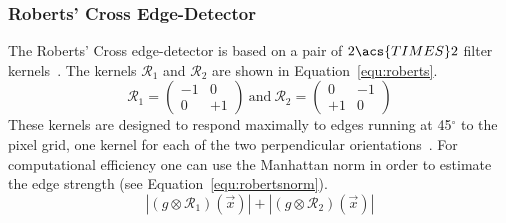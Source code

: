 \documentclass[12pt,a4paper,oneside,openright]{book}
\newcommand{\equ}[1]{Equation~\ref{equ:#1}}
\begin{document}
\begin{CJK}{UTF8}{}
\subsubsection{Roberts' Cross Edge-Detector}
The Roberts' Cross edge-detector is based on a pair of $2\acs{TIMES} 2$ filter kernels~\citep{roberts}. The kernels $\mathcal{R}_1$ and $\mathcal{R}_2$ are shown in \equ{roberts}.
\begin{equation}\label{equ:roberts}
  \mathcal{R}_1=\begin{pmatrix} -1 &  0 \\ 0 & +1 \end{pmatrix}
  \mathrm{\ and\ }
  \mathcal{R}_2=\begin{pmatrix}  0 & -1 \\ +1 &  0 \end{pmatrix}
\end{equation}
These kernels are designed to respond maximally to edges running at 45$^\circ$ to the pixel grid, one kernel for each of the two perpendicular orientations~\citep{roberts}. For computational efficiency one can use the Manhattan norm in order to estimate the edge strength (see \equ{robertsnorm}). 
\begin{equation}\label{equ:robertsnorm}
  |(g\otimes\mathcal{R}_1)(\vec{x})|+|(g\otimes\mathcal{R}_2)(\vec{x})|
\end{equation}


\end{CJK}
\end{document}
